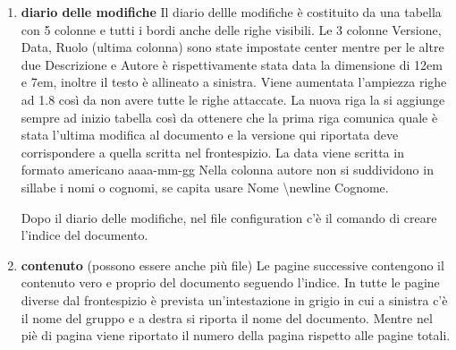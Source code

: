 \begin{enumerate}
    \item \textbf{diario delle modifiche}
            Il diario dellle modifiche è costituito da una tabella con 5 colonne e tutti i 
            bordi anche delle righe visibili. Le 3 colonne Versione, Data, Ruolo (ultima colonna) 
            sono state impostate center mentre per le altre due Descrizione e Autore è 
            rispettivamente stata data la dimensione di 12em e 7em, inoltre il testo è allineato 
            a sinistra. 
            Viene aumentata l'ampiezza righe ad 1.8 così da non avere tutte le righe attaccate. \newline
            La nuova riga la si aggiunge sempre ad inizio tabella così da ottenere che la prima 
            riga comunica quale è stata l'ultima modifica al documento e la versione qui riportata 
            deve corrispondere a quella scritta nel frontespizio. \newline
            La data viene scritta in formato americano aaaa-mm-gg
            Nella colonna autore non si suddividono in sillabe i nomi o cognomi, se capita usare
            Nome \textbackslash newline Cognome.


            Dopo il diario delle modifiche, nel file configuration c'è il comando di creare 
            l'indice del documento.

    \item \textbf{contenuto} (possono essere anche più file)
            Le pagine successive contengono il contenuto vero e proprio del documento seguendo 
            l'indice. In tutte le pagine diverse dal frontespizio è prevista un'intestazione in 
            grigio in cui a sinistra c'è il nome del gruppo e a destra si riporta il nome del documento.
            Mentre nel piè di pagina viene riportato il numero della pagina rispetto alle pagine totali.
\end{enumerate}

